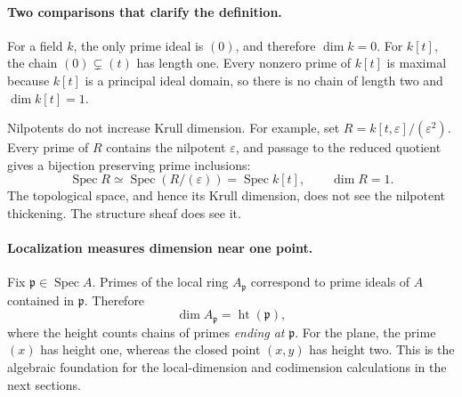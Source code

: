 \paragraph{Two comparisons that clarify the definition.}
For a field \(k\), the only prime ideal is \((0)\), and therefore
\(\dim k=0\).  For \(k[t]\), the chain
\((0)\subsetneq(t)\) has length one.  Every nonzero prime of
\(k[t]\) is maximal because \(k[t]\) is a principal ideal domain,
so there is no chain of length two and \(\dim k[t]=1\).

Nilpotents do not increase Krull dimension.  For example, set
\(R=k[t,\varepsilon]/(\varepsilon^2)\).  Every prime of \(R\)
contains the nilpotent \(\varepsilon\), and passage to the reduced
quotient gives a bijection preserving prime inclusions:
\[
 \operatorname{Spec}R\simeq
 \operatorname{Spec}(R/(\varepsilon))=
 \operatorname{Spec}k[t],
 \qquad \dim R=1.
\]
The topological space, and hence its Krull dimension, does not see
the nilpotent thickening.  The structure sheaf does see it.

\paragraph{Localization measures dimension near one point.}
Fix \(\mathfrak p\in\operatorname{Spec}A\).  Primes of the local
ring \(A_{\mathfrak p}\) correspond to prime ideals of \(A\)
contained in \(\mathfrak p\).  Therefore
\[
 \dim A_{\mathfrak p}=\operatorname{ht}(\mathfrak p),
\]
where the height counts chains of primes \emph{ending at}
\(\mathfrak p\).  For the plane, the prime \((x)\) has height
one, whereas the closed point \((x,y)\) has height two.  This is
the algebraic foundation for the local-dimension and codimension
calculations in the next sections.
